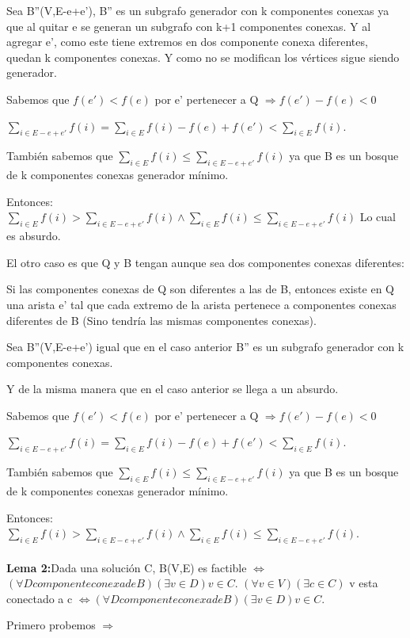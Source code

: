 Sea B''(V,E-e+e'), B'' es un subgrafo generador con k componentes conexas ya que al quitar e se generan un subgrafo con k+1 componentes conexas. Y al agregar e', como este  tiene extremos en dos componente conexa diferentes, quedan k componentes conexas. Y como no se modifican los vértices sigue siendo generador.

Sabemos que $f(e') < f(e)$ por e' pertenecer a Q $\Rightarrow f(e') - f(e) < 0$

$\sum_{i \in E-e+e'} f(i) = \sum_{i \in E} f(i) - f(e) + f(e') < \sum_{i \in E} f(i)$.

También sabemos que $\sum_{i \in E} f(i) \leq \sum_{i \in E-e+e'} f(i)$ ya que B es un bosque de k componentes conexas generador mínimo.

Entonces: $\sum_{i \in E} f(i) > \sum_{i \in E-e+e'} f(i) \wedge \sum_{i \in E} f(i) \leq \sum_{i \in E-e+e'} f(i)$
Lo cual es absurdo.

El otro caso es que Q y B tengan aunque sea dos componentes conexas diferentes:

Si las componentes conexas de Q son diferentes a las de B, entonces existe en Q una arista e' tal que cada extremo de la arista pertenece a componentes conexas diferentes de B (Sino tendría las mismas componentes conexas).

Sea B''(V,E-e+e') igual que en el caso anterior B'' es un subgrafo generador con k componentes conexas.

Y de la misma manera que en el caso anterior se llega a un absurdo.

Sabemos que $f(e') < f(e)$ por e' pertenecer a Q $\Rightarrow f(e') - f(e) < 0$

$\sum_{i \in E-e+e'} f(i) = \sum_{i \in E} f(i) - f(e) + f(e') < \sum_{i \in E} f(i)$.

También sabemos que $\sum_{i \in E} f(i) \leq \sum_{i \in E-e+e'} f(i)$ ya que B es un bosque de k componentes conexas generador mínimo.

Entonces: $\sum_{i \in E} f(i) > \sum_{i \in E-e+e'} f(i) \wedge \sum_{i \in E} f(i) \leq \sum_{i \in E-e+e'} f(i)$. \\ \\


\textbf{Lema 2:}Dada una solución C, B(V,E) es factible $\Longleftrightarrow$ $(\forall D componente conexa de B)(\exists v \in D) v \in C$.  $(\forall v \in V)(\exists c \in C)$ v esta conectado a c $\Leftrightarrow (\forall D componente conexa de B)(\exists v \in D) v \in C$.


Primero probemos $\Rightarrow$

